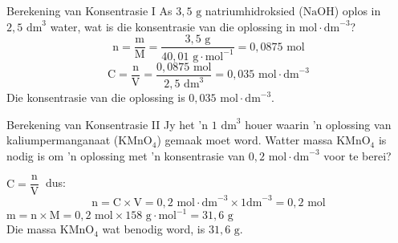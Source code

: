       \noindent
      \begin{wex}{Berekening van Konsentrasie I}
{
      \label{m38712*probfhsst!!!underscore!!!id1654}
      \label{m38712*id283003}As $3,5\text{ g}$ natriumhidroksied ($\text{NaOH}$) oplos in $2,5 {\text{ dm}}^{3}$ water, wat is die konsentrasie van die oplossing in $\text{mol}\ensuremath{\cdot}{\text{dm}}^{-3}$? }
{
      \label{m38712*id283067}\nopagebreak\noindent{}
    \begin{equation*}
    \text{n}=\frac{\text{m}}{\text{M}}=\frac{3,5 \text{ g}}{40,01 \text{ g} \cdot \text{mol}^{-1}} = 0,0875 \text{ mol}
      \end{equation*}
\begin{equation*}
\text{C}=\frac{\text{n}}{\text{V}}=\frac{0,0875 \text{ mol}}{2,5 \text{ dm}^{3} }=0,035 \text{ mol} \cdot \text{dm}^{-3}
\end{equation*}
Die konsentrasie van die oplossing is $0,035 \text{ mol} \cdot {\text{dm}}^{-3}$.
}
    \end{wex}

    \noindent
\par


      \begin{wex}{Berekening van Konsentrasie II }
{
Jy het 'n $1 {\text{ dm}}^{3}$ houer waarin 'n oplossing van kaliumpermanganaat ($\text{KMnO}{}_{4}$) gemaak moet word. Watter massa $\text{KMnO}{}_{4}$ is nodig is om 'n oplossing met 'n konsentrasie van $0,2 \text{ mol}\cdot \text{dm}^{-3}$ voor te berei? 
     }
{
$\text{C}=\dfrac{\text{n}}{\text{V}}~$ dus:
      \label{m38712*id283321}\nopagebreak\noindent{}        
    \begin{equation*}
    \text{n}=\text{C}\ensuremath{\times}\text{V}=0,2 \text{ mol} \cdot \text{dm}^{-3} \times 1 \text{dm}^{-3} = 0,2 \text{ mol}
      \end{equation*}
$\text{m}=\text{n} \times \text{M} = 0,2 \text{ mol} \times 158 \text{ g} \cdot \text{mol}^{-1} = 31,6 \text{ g}$\\
Die massa $\text{KMnO}{}_{4}$ wat benodig word, is $31,6 \text{ g}$.
 
}
    \end{wex}
    \noindent
\label{m38712*secfhsst!!!underscore!!!id1795} 

